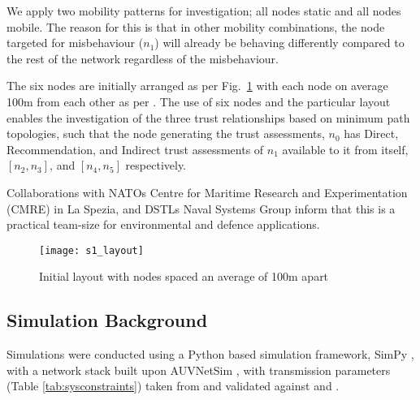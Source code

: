 We apply two mobility patterns for investigation; all nodes static and all nodes mobile.
The reason for this is that in other mobility combinations, the node targeted for misbehaviour ($n_1$) will already be behaving differently compared to the rest of the network regardless of the misbehaviour.

The six nodes are initially arranged as per Fig.~\ref{fig:s1_layout} with each node on average 100m from each other as per \cite{Guo11}.
The use of six nodes and the particular layout enables the investigation of the three trust relationships based on minimum path topologies, such that the node generating the trust assessments, $n_0$ has Direct, Recommendation, and Indirect trust assessments of $n_1$ available to it from itself, $[n_2,n_3]$, and $[n_4,n_5]$ respectively. 

Collaborations with NATOs Centre for Maritime Research and Experimentation (CMRE) in La Spezia, and DSTLs Naval Systems Group inform that this is a practical team-size for environmental and defence applications.

%
\begin{figure}[h]
	\centering
	\texttt{[image: s1\_layout]}
	\caption{Initial layout with nodes spaced an average of 100m apart}
	\label{fig:s1_layout}
\end{figure}
%

\subsection{Simulation Background}

Simulations were conducted using a Python based simulation framework, SimPy \cite{Mueller2003SimPy}, with a network stack built upon AUVNetSim \cite{Miquel2008}, with transmission parameters (Table \ref{tab:sysconstraints}) taken from and validated against \cite{Stojanovic2007} and \cite{Stefanov2011}.

